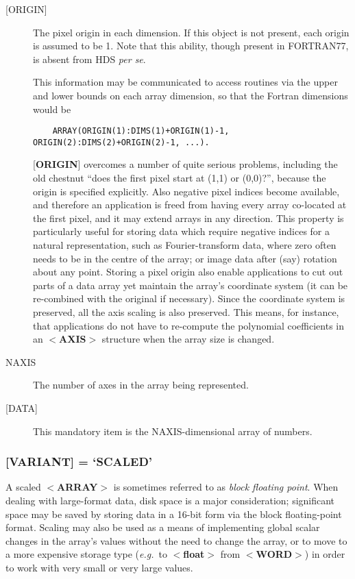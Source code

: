 \documentclass[twoside,11pt]{article}
\renewcommand{\_}{\texttt{\symbol{95}}}
\begin{document}
\begin{description}
\item [{[}ORIGIN{]}]
The pixel origin in each dimension.  If this object is not present,
each origin is assumed to be 1.  Note that this
ability, though present in FORTRAN77, is
absent from HDS {\it per se}.

This information may be communicated to
access routines via the upper and lower bounds on each array dimension,
so that the Fortran dimensions would be
\begin{verbatim}
    ARRAY(ORIGIN(1):DIMS(1)+ORIGIN(1)-1, ORIGIN(2):DIMS(2)+ORIGIN(2)-1, ...).
\end{verbatim}

{[}{\bf ORIGIN}{]} overcomes a number of quite serious problems,
including the old chestnut ``does the first pixel start at (1,1) or
(0,0)?'', because the origin is specified explicitly. Also negative
pixel indices become available, and therefore an application is freed
from having every array co-located at the first pixel, and it may extend
arrays in any direction. This property is particularly useful for
storing data which require negative indices for a natural
representation, such as Fourier-transform data, where zero often needs to
be in the centre of the array; or image data after (say) rotation about
any point.  Storing a pixel origin also enable applications to cut out parts
of a data array yet maintain the array's coordinate system (it can be
re-combined with the original if necessary). Since the coordinate
system is preserved, all the axis scaling is also preserved. This means,
for instance, that applications do not have to re-compute the polynomial
coefficients in an $<${\bf AXIS}$>$ structure when the array size is
changed.
\item [NAXIS]
The number of axes in the array being represented.
\item [{[}DATA{]}]
This mandatory item is the NAXIS-dimensional array of numbers.
\end{description}

\subsubsection{{[}{\bf VARIANT}{]} = `SCALED'}
A scaled \mbox{$<${\bf ARRAY}$>$} is sometimes referred
to as {\it block floating point}.
When dealing with large-format data, disk space is a major
consideration; significant space may be saved by storing data in a
16-bit form via the block floating-point format.  Scaling may also be
used as a means of implementing global scalar changes in the array's
values without the need to change the array, or to move to a more
expensive storage type ({\it e.g.}\  to $<${\bf float}$>$ from
$<${\bf \_WORD}$>$) in order to work with very small or very large values.
\end{document}
